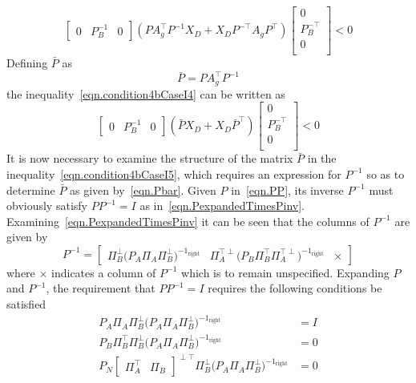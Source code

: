 \begin{equation}
  \label{eqn.condition4bCaseI4}
  \begin{bmatrix}
    0 & P_{B}^{-1} & 0
  \end{bmatrix}
  (PA_{g}^{\top}P^{-1}X_{D} + X_{D}P^{-\top}A_{g}P^{\top})
  \begin{bmatrix}
    0 \\
    P_{B}^{-\top} \\
    0 \\
  \end{bmatrix}
  < 0
\end{equation}
Defining $\bar{P}$ as
\begin{equation}
  \label{eqn.Pbar}
  \bar{P} = PA_{g}^{\top}P^{-1}
\end{equation}
the inequality\ \eqref{eqn.condition4bCaseI4} can be written as
\begin{equation}
  \label{eqn.condition4bCaseI5}
  \begin{bmatrix}
    0 & P_{B}^{-1} & 0
  \end{bmatrix}
  (\bar{P}X_{D} + X_{D}\bar{P}^{\top})
  \begin{bmatrix}
    0 \\
    P_{B}^{-\top} \\
    0 \\
  \end{bmatrix}
  < 0
\end{equation}
It is now necessary to examine the structure of the matrix $\bar{P}$ in the inequality\ \eqref{eqn.condition4bCaseI5}, which requires an expression for $P^{-1}$ so as to determine $\bar{P}$ as given by\ \eqref{eqn.Pbar}.
Given $P$ in\ \eqref{eqn.PP}, its inverse $P^{-1}$ must obviously satisfy $PP^{-1}=I$ as in\ \eqref{eqn.PexpandedTimesPinv}.
Examining\ \eqref{eqn.PexpandedTimesPinv} it can be seen that the columns of $P^{-1}$ are given by
\begin{equation}
  \label{eqn.PPinv}
  P^{-1} =
  \begin{bmatrix}
    \Pi_{B}^{\perp}\bigr(P_{A}\Pi_{A}\Pi_{B}^{\perp}\bigr)^{-1_{\text{right}}}
    &
    \Pi_{A}^{\top\perp}\bigr(P_{B}\Pi_{B}^{\top}\Pi_{A}^{\top\perp}\bigr)^{-1_{\text{right}}}
    &
    \times
  \end{bmatrix}
\end{equation}
where $\times$ indicates a column of $P^{-1}$ which is to remain unspecified.
Expanding $P$ and $P^{-1}$, the requirement that $PP^{-1}=I$ requires the following conditions be satisfied
\begin{equation}
  \label{eqn.firstColumnOfPinv}
  \begin{split}
    P_{A}\Pi_{A}\Pi_{B}^{\perp}\bigr(P_{A}\Pi_{A}\Pi_{B}^{\perp}\bigr)^{-1_{\text{right}}} &= I \\
    P_{B}\Pi_{B}^{\top}\Pi_{B}^{\perp}\bigr(P_{A}\Pi_{A}\Pi_{B}^{\perp}\bigr)^{-1_{\text{right}}} &= 0 \\
    P_{N}
    \begin{bmatrix}
      \Pi_{A}^{\top} & \Pi_{B}
    \end{bmatrix}^{\perp\top}
    \Pi_{B}^{\perp}\bigr(P_{A}\Pi_{A}\Pi_{B}^{\perp}\bigr)^{-1_{\text{right}}} &= 0
  \end{split}
\end{equation}
